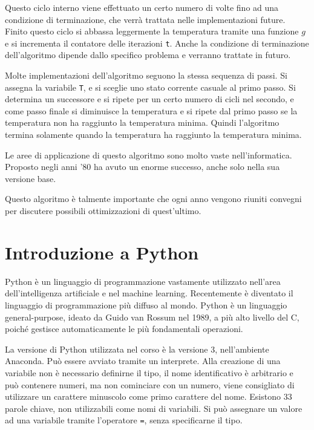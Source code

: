 \documentclass{article}
\numberwithin{equation}{subsection}
\begin{document}
Questo ciclo interno viene effettuato un certo numero di volte fino ad una condizione di 
terminazione, che verrà trattata nelle implementazioni future. 
Finito questo ciclo si abbassa leggermente la temperatura tramite una funzione $g$ e si incrementa il contatore 
delle iterazioni \verb|t|. 
Anche la condizione di terminazione dell'algoritmo dipende dallo specifico problema 
e verranno trattate in futuro. 


Molte implementazioni dell'algoritmo seguono la stessa sequenza di passi. Si assegna la variabile \verb|T|, e si sceglie uno stato corrente casuale al primo passo. Si determina 
un successore e si ripete per un certo numero di cicli nel secondo, e come passo finale si diminuisce la temperatura e si ripete dal primo passo se la temperatura non ha 
raggiunto la temperatura minima. Quindi l'algoritmo termina solamente quando la temperatura ha raggiunto la temperatura minima. 

Le aree di applicazione di questo algoritmo sono molto vaste nell'informatica. Proposto negli anni '80 ha avuto un enorme successo, anche solo nella sua versione base. 

Questo algoritmo è talmente importante che ogni anno vengono riuniti convegni per discutere possibili 
ottimizzazioni di quest'ultimo. 

\clearpage

\section{Introduzione a Python}

Python è un linguaggio di programmazione vastamente utilizzato nell'area dell'intelligenza artificiale e nel machine learning. Recentemente è diventato il linguaggio di 
programmazione più diffuso al mondo. Python è un linguaggio general-purpose, ideato da Guido van Rossum nel 1989, a più alto livello del C, poiché gestisce automaticamente le 
più fondamentali operazioni. 

La versione di Python utilizzata nel corso è la versione 3, nell'ambiente Anaconda. Può essere avviato tramite un interprete. Alla creazione di una variabile non 
è necessario definirne il tipo, il nome identificativo è arbitrario e può contenere numeri, ma non cominciare con un numero, viene consigliato di utilizzare un carattere 
minuscolo come primo carattere del nome. Esistono 33 parole chiave, non utilizzabili come nomi di variabili. Si può assegnare un valore ad una variabile tramite l'operatore 
\verb|=|, senza specificarne il tipo. 
\end{document}

